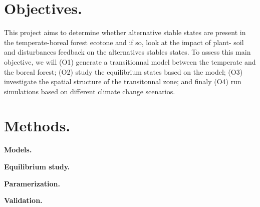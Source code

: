 

\section{Objectives.} 

This project aims to determine whether alternative stable states are present
in the temperate-boreal forest ecotone and if so, look at the impact of plant-
soil and disturbances feedback on the alternatives stables states. To assess
this main objective, we will (O1) generate a transitionnal model between the
temperate and the boreal forest; (O2) study the equilibrium states based on
the model; (O3) investigate the spatial structure of the transitonnal zone;
and finaly (O4) run simulations based on different climate change scenarios.
\\

\section{Methods.}

\textbf{Models.}

\textbf{Equilibrium study.}

\textbf{Paramerization.} 

\textbf{Validation.}


\newpage


